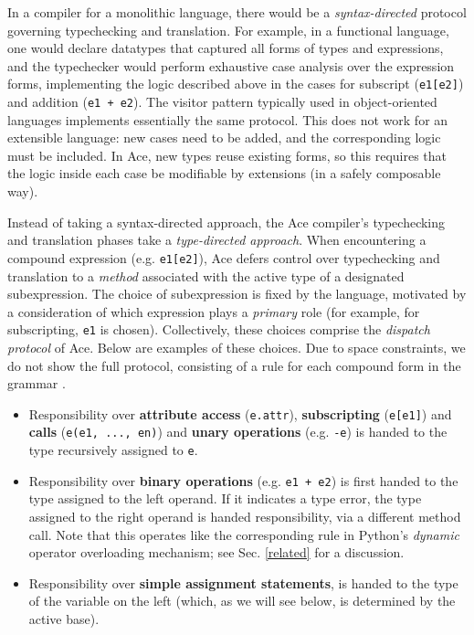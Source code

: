\documentclass[9pt,preprint]{sigplanconf}
\begin{document}
In a compiler for a monolithic language, there would be a \emph{syntax-directed} protocol governing typechecking and translation. For example, in a functional language, one would declare datatypes that captured all forms of types and expressions, and the typechecker would perform exhaustive case analysis over the expression forms, implementing the logic described above in the cases for subscript (\verb|e1[e2]|) and addition (\verb|e1 + e2|). The visitor pattern typically used in object-oriented languages implements essentially the same protocol. This does not work for an extensible language: new cases need to be added, and the corresponding logic must be included. In Ace, new types reuse existing forms, so this requires that the logic inside each case be modifiable by extensions (in a safely composable way).

Instead of taking a syntax-directed approach, the Ace compiler's typechecking and translation phases take a \emph{type-directed approach}. When encountering a compound expression (e.g. \verb|e1[e2]|), Ace defers control over typechecking and translation to a \emph{method} associated with the active type of a designated subexpression. The choice of subexpression is fixed by the language, motivated by a consideration of which expression plays a \emph{primary} role (for example, for subscripting, \verb|e1| is chosen). Collectively, these choices comprise the \emph{dispatch protocol} of Ace. Below are examples of these choices. Due to space constraints, we do not show the full protocol, consisting of a rule for each compound form in the grammar \cite{pythonast}.
\begin{itemize}
\item Responsibility over {\bf attribute access} (\texttt{e.attr}), {\bf subscripting} (\texttt{e[e1]}) and \textbf{calls} (\verb|e(e1, ..., en)|) and {\bf unary operations} (e.g. \verb|-e|) is handed to the type recursively assigned to \texttt{e}.
\item Responsibility over {\bf binary operations} (e.g. \verb|e1 + e2|) is first handed to the type assigned to the left operand. If it indicates a type error, the type assigned to the right operand is handed responsibility, via a different method call. {Note that this operates like the corresponding rule in Python's \emph{dynamic} operator overloading mechanism; see Sec. \ref{related} for a discussion.}
\item Responsibility over {\bf simple assignment statements}, is handed to the type of the variable on the left (which, as we will see below, is determined by the active base).
\end{itemize}
\end{document}
